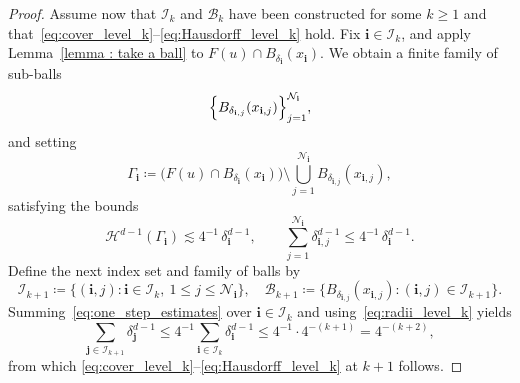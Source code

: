 \documentclass[reqno,11pt]{amsart}
\newcommand{\1}{\mathds{1}}  %
\numberwithin{equation}{section}
\begin{document}
\begin{proof}
Assume now that $\mathcal I_k$ and $\mathcal B_k$ have been constructed for some $k\ge 1$ and that~\eqref{eq:cover_level_k}--\eqref{eq:Hausdorff_level_k} hold. Fix $\mathbf i\in\mathcal I_k$, and apply Lemma~\ref{lemma : take a ball} to $F(u)\cap B_{\delta_{\mathbf i}}(x_{\mathbf i})$. We obtain a finite family of sub-balls
\[
    \Bigl\{B_{\delta_{\mathbf i,j}}(x_{\mathbf i,j})\Bigr\}_{j=1}^{\mathcal N_{\mathbf i}},
\]
and setting
\[
    \Gamma_{\mathbf i}\coloneqq \bigl(F(u)\cap B_{\delta_{\mathbf i}}(x_{\mathbf i})\bigr)\setminus
    \bigcup_{j=1}^{\mathcal N_{\mathbf i}}B_{\delta_{\mathbf i,j}}(x_{\mathbf i,j}),
\]
satisfying the  bounds
\begin{equation}\label{eq:one_step_estimates}
    \mathcal H^{d-1}(\Gamma_{\mathbf i})\lesssim 4^{-1}\,\delta_{\mathbf i}^{d-1}, \qquad \sum_{j=1}^{\mathcal N_{\mathbf i}}\delta_{\mathbf i,j}^{d-1}\le 4^{-1}\,\delta_{\mathbf i}^{d-1}.
\end{equation}
Define the next index set and family of balls by
\[
\mathcal I_{k+1}\coloneqq \bigl\{(\mathbf i,j) \colon \mathbf i\in\mathcal I_k,\ 1\le j\le \mathcal N_{\mathbf i}\bigr\},
\quad
\mathcal B_{k+1}\coloneqq \bigl\{B_{\delta_{\mathbf i,j}}(x_{\mathbf i,j}) \colon (\mathbf i,j)\in\mathcal I_{k+1}\bigr\}.
\]
Summing~\eqref{eq:one_step_estimates} over $\mathbf i\in\mathcal I_k$ and using~\eqref{eq:radii_level_k} yields
\[
    \sum_{\mathbf j\in\mathcal I_{k+1}}\delta_{\mathbf j}^{d-1}
\le 4^{-1}\sum_{\mathbf i\in\mathcal I_k}\delta_{\mathbf i}^{d-1}
\le 4^{-1}\cdot 4^{-(k+1)}=4^{-(k+2)},
\]
from which \eqref{eq:cover_level_k}--\eqref{eq:Hausdorff_level_k} at $k+1$ follows.


\end{proof}
\end{document}

